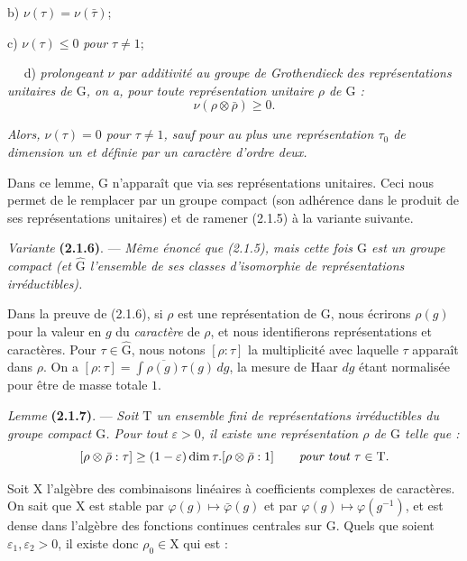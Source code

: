 \documentclass[11pt,leqno]{article}
\newcommand{\Page}[1]{\ifvmode\noindent\else\unskip\ \fi{\footnotesize\textcolor{gray}{[p.\,#1]}}\ \ignorespaces}
\begin{document}
\noindent b) \(\nu(\tau)=\nu(\bar{\tau})\);

\noindent c) \(\nu(\tau)\leq0\) \textit{pour} \(\tau\neq1\);

\Page{190}
\noindent d) \textit{prolongeant \(\nu\) par additivité au groupe de Grothendieck des représentations unitaires de \(\mathrm{G}\), on a, pour toute représentation unitaire \(\rho\) de \(\mathrm{G}\) :}
\[
\nu(\rho\otimes\bar{\rho})\geq0.
\]

\textit{Alors, \(\nu(\tau)=0\) pour \(\tau\neq1\), sauf pour au plus une représentation \(\tau_0\) de dimension un et définie par un caractère d’ordre deux.}

Dans ce lemme, \(\mathrm{G}\) n’apparaît que via ses représentations unitaires. Ceci nous permet de le remplacer par un groupe compact (son adhérence dans le produit de ses représentations unitaires) et de ramener (2.1.5) à la variante suivante.

\textit{Variante} \textbf{(2.1.6)}. — \textit{Même énoncé que \textup{(2.1.5)}, mais cette fois \(\mathrm{G}\) est un groupe compact (et \(\widehat{\mathrm{G}}\) l’ensemble de ses classes d’isomorphie de représentations irréductibles).}

Dans la preuve de (2.1.6), si \(\rho\) est une représentation de \(\mathrm{G}\), nous écrirons \(\rho(g)\) pour la valeur en \(g\) du \textit{caractère} de \(\rho\), et nous identifierons représentations et caractères. Pour \(\tau\in\widehat{\mathrm{G}}\), nous notons \([\rho:\tau]\) la multiplicité avec laquelle \(\tau\) apparaît dans \(\rho\). On a \([\rho:\tau]=\int\overline{\rho(g)}\tau(g)\,dg\), la mesure de Haar \(dg\) étant normalisée pour être de masse totale \(1\).

\textit{Lemme} \textbf{(2.1.7)}. — \textit{Soit \(\mathrm{T}\) un ensemble fini de représentations irréductibles du groupe compact \(\mathrm{G}\). Pour tout \(\varepsilon>0\), il existe une représentation \(\rho\) de \(\mathrm{G}\) telle que :}
\[
[\rho\otimes\bar{\rho}:\tau]
 \geq(1-\varepsilon)\dim\tau.[\rho\otimes\bar{\rho}:1]
 \qquad\text{\itshape pour tout }\tau\in\mathrm{T}.
\]

Soit \(\mathrm{X}\) l’algèbre des combinaisons linéaires à coefficients complexes de caractères. On sait que \(\mathrm{X}\) est stable par \(\varphi(g)\mapsto\bar{\varphi}(g)\) et par \(\varphi(g)\mapsto\varphi(g^{-1})\), et est dense dans l’algèbre des fonctions continues centrales sur \(\mathrm{G}\). Quels que soient \(\varepsilon_1,\varepsilon_2>0\), il existe donc \(\rho_0\in\mathrm{X}\) qui est :
\end{document}

